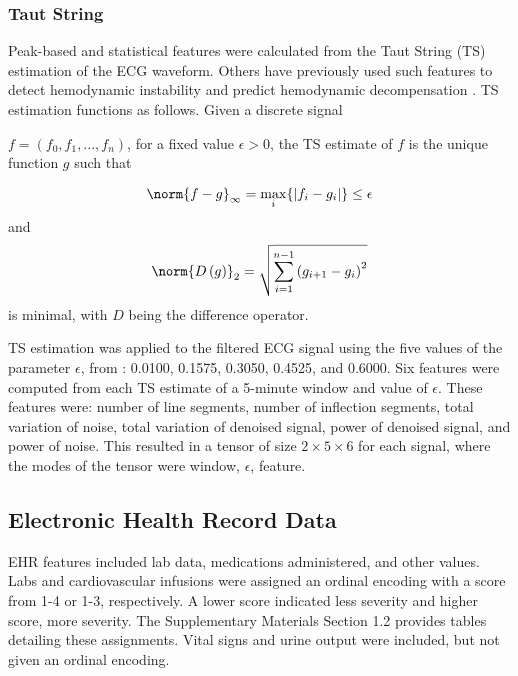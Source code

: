 \subsubsection{Taut String} \label{sec:methods_ts}
Peak-based and statistical features were calculated from the Taut String (TS) estimation \cite{taut_string} of the ECG waveform. Others have previously used such features to detect hemodynamic instability \cite{belle_signal_2016} and predict hemodynamic decompensation \cite{hernandez_multimodal_2021, kim_prediction_2022}. TS estimation functions as follows. Given a discrete signal

$f = (f_0, f_1, ..., f_n)$,
for a fixed value $\epsilon > 0$, the TS estimate of $f$ is the unique function $g$ such that 

\begin{equation*}
    \norm{f - g}_{\infty} = \max\limits_{i}\{ \lvert f_i - g_i \rvert \} \leq \epsilon
\end{equation*}
and
\begin{equation*}
    \norm{D\left( g \right)}_{2} = \sqrt{\sum^{n - 1}_{i = 1} \left( g_{i + 1} - g_i \right)^2}
\end{equation*}
is minimal, with $D$ being the difference operator.

TS estimation was applied to the filtered ECG signal using the five values of the parameter $\epsilon$, from \cite{hernandez_multimodal_2021}: 0.0100, 0.1575, 0.3050, 0.4525, and 0.6000. Six features were computed from each TS estimate of a 5-minute window and value of $\epsilon$. These features were: number of line segments, number of inflection segments, total variation of noise, total variation of denoised signal, power of denoised signal, and power of noise. This resulted in a tensor of size $2 \times 5 \times 6$ for each signal, where the modes of the tensor were window, $\epsilon$, feature. 

\subsection{Electronic Health Record Data} \label{sec:methods_ehr}
EHR features included lab data, medications administered, and other values. Labs and cardiovascular infusions were assigned an ordinal encoding with a score from 1-4 or 1-3, respectively. A lower score indicated less severity and higher score, more severity. The Supplementary Materials Section 1.2 provides tables detailing these assignments. Vital signs and urine output were included, but not given an ordinal encoding. 

